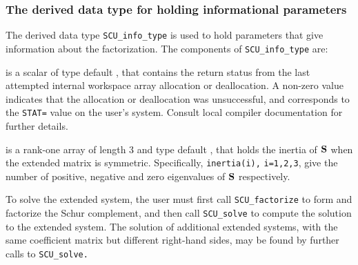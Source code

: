 \documentclass{galahad}
\newcommand{\packagename}{SCU}
\begin{document}
\subsubsection{The derived data type for holding informational
 parameters}\label{typeinfo}
The derived data type 
{\tt \packagename\_info\_type} 
is used to hold parameters that give information about the factorization.
The components of
{\tt \packagename\_info\_type} 
are:

\begin{description}
 is a scalar of type default \integer, that contains 
the return status from the last attempted internal  
workspace array allocation or deallocation. 
A non-zero value indicates that the allocation or deallocation was
 unsuccessful, and corresponds to the {\tt STAT=} value on the user's system. 
Consult local compiler documentation for further details. 
 
 is a rank-one array of length 3 and type default \integer, 
that holds the inertia of ${\mathbf{S}}$ when the extended matrix is symmetric. 
Specifically, {\tt inertia(i),} {\tt i=1,2,3},  
give the number of positive, negative and zero eigenvalues of  
${\mathbf{S}}$ respectively. 
 
\end{description}


\galarguments
To solve the extended system, 
the user must first call {\tt \packagename\_factorize} to form and factorize 
the Schur complement, 
and then call {\tt \packagename\_solve} to compute the solution to the extended 
system. The solution of additional extended systems, with the 
same coefficient matrix but different right-hand sides, may 
be found by further calls to 
{\tt \packagename\_solve.} 
\end{document}
